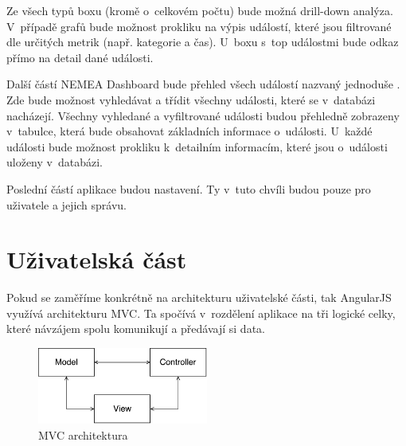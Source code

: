 Ze všech typů boxu (kromě o~celkovém počtu) bude možná drill-down analýza. V~případě grafů bude možnost prokliku na výpis událostí, které jsou filtrované dle určitých metrik (např. kategorie a čas). U~boxu s~top událostmi bude odkaz přímo na detail dané události.

Další částí NEMEA Dashboard bude přehled všech událostí nazvaný jednoduše . Zde bude možnost vyhledávat a třídit všechny události, které se v~databázi nacházejí. Všechny vyhledané a vyfiltrované události budou přehledně zobrazeny v~tabulce, která bude obsahovat základních informace o~události. U~každé události bude možnost prokliku k~detailním informacím, které jsou o~události uloženy v~databázi.

Poslední částí aplikace budou nastavení. Ty v~tuto chvíli budou pouze pro uživatele a jejich správu.

\section{Uživatelská část}
\label{sec:mvc}
Pokud se zaměříme konkrétně na architekturu uživatelské části, tak AngularJS využívá architekturu MVC. Ta spočívá v~rozdělení aplikace na tři logické celky, které návzájem spolu komunikují a předávají si data.

\begin{figure}[ht]
    \centering
    \includegraphics[width=0.5\textwidth]{fig/mvc.pdf}
    \caption{MVC architektura} \label{fig:mvc}
\end{figure}


